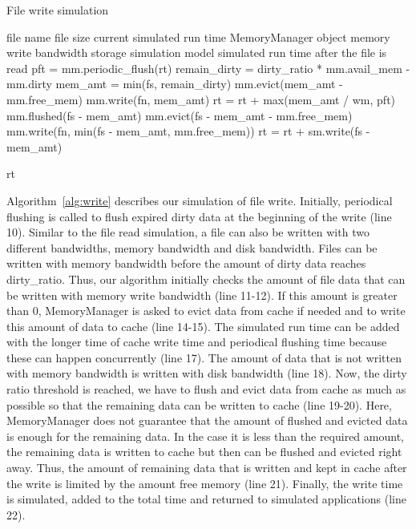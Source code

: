 \documentclass[conference]{IEEEtran}
\newcommand{\Desc}[2]{\State \makebox[2em][l]{#1}#2}
\begin{document}
			\begin{algorithm}\caption{File write simulation}\label{alg:write}
				\small
				\begin{algorithmic}[1]
					\Input
        				\Desc{fn}{file name}
        				\Desc{fs}{file size}
						\Desc{rt}{current simulated run time}
						\Desc{mm}{MemoryManager object}
						\Desc{wm}{memory write bandwidth}
						\Desc{sm}{storage simulation model}
   					\EndInput
   					\Output
						\Desc{rt}{simulated run time after the file is read}
   					\EndOutput
   					\State pft = mm.periodic\_flush(rt)
					\State remain\_dirty = dirty\_ratio * mm.avail\_mem - mm.dirty
					\State mem\_amt = min(fs, remain\_dirty)
					 
    					\State mm.evict(mem\_amt - mm.free\_mem)
    					\State mm.write(fn, mem\_amt)
    				\EndIf
    				\State rt = rt + max(mem\_amt / wm, pft) 
					  
						\State mm.flushed(fs - mem\_amt)  
						\State mm.evict(fs - mem\_amt  - mm.free\_mem) 
						\State mm.write(fn, min(fs - mem\_amt, mm.free\_mem))
						\State rt = rt + sm.write(fs - mem\_amt)
					\EndIf
					
					\Return rt
					
				\end{algorithmic}
			\end{algorithm}

			Algorithm~\ref{alg:write} describes our simulation of file write. 
			Initially, periodical flushing is called to flush expired dirty data 
			at the beginning of the write (line 10).
			Similar to the file read simulation, a file can also be written with 
			two different bandwidths, memory bandwidth and disk bandwidth. 
			Files can be written with memory bandwidth before the amount 
			of dirty data reaches dirty\_ratio. Thus, our algorithm initially checks 
			the amount of file data that can be written with memory write 
			bandwidth (line 11-12).
			If this amount is greater than 0, MemoryManager is asked to evict 
			data from cache if needed and to write this amount of data to cache 
			(line 14-15).
			The simulated run time can be added with the longer time of cache write 
			time and periodical flushing time because these can happen 
			concurrently (line 17).
			The amount of data that is not written with memory bandwidth is written 
			with disk bandwidth (line 18). 
			Now, the dirty ratio threshold is reached, we have to flush and evict 
			data from cache as much as possible so that 
			the remaining data can be written to cache (line 19-20). 
			Here, MemoryManager does not guarantee that the amount of flushed 
			and evicted data is enough for the remaining data. In the case it is 
			less than the required amount, the remaining data is written to cache 
			but then can be flushed and evicted right away. Thus, the amount 
			of remaining data that is written and kept in cache after the write 
			is limited by the amount free memory (line 21). 
			Finally, the write time is simulated, added to the total time and 
			returned to simulated applications (line 22).
			
\end{document}
